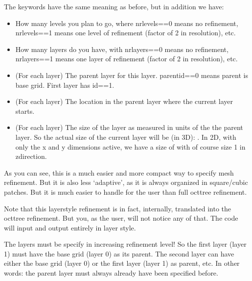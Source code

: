 \documentclass[letterpaper,10pt,english]{sphinxmanual}
\begin{document}
The keywords have the same meaning as before, but in addition we have:
\begin{itemize}
\item {} 
 How many levels you plan to go, where
nrlevels==0 means no refinement, nrlevels==1 means one level of refinement
(factor of 2 in resolution), etc.

\item {} 
 How many layers do you have, with nrlayers==0
means no refinement, nrlayers==1 means one layer of refinement (factor of
2 in resolution), etc.

\item {} 
 (For each layer) The parent layer for this
layer. parentid==0 means parent is base grid. First layer has id==1.

\item {} 
 (For each layer) The location in the parent
layer where the current layer starts.

\item {} 
 (For each layer) The size of the layer as measured in units of
the the parent layer. So the actual size of the current layer will be (in
3\sphinxhyphen{}D): . In 2\sphinxhyphen{}D, with only the x\sphinxhyphen{} and y\sphinxhyphen{} dimensions active,
we have a size of  with of course size 1 in z\sphinxhyphen{}direction.

\end{itemize}

As you can see, this is a much easier and more compact way to specify
mesh refinement. But it is also less ‘adaptive’, as it is always organized
in square/cubic patches. But it is much easier to handle for the user than
full oct\sphinxhyphen{}tree refinement.

Note that this layer\sphinxhyphen{}style refinement is in fact, internally, translated
into the oct\sphinxhyphen{}tree refinement. But you, as the user, will not notice any
of that. The code will input and output entirely in layer style.

 The layers must be specify in increasing refinement level!  So
the first layer (layer 1) must have the base grid (layer 0) as its
parent. The second layer can have either the base grid (layer 0) or the
first layer (layer 1) as parent, etc. In other words: the parent layer
must always already have been specified before.
\end{document}
